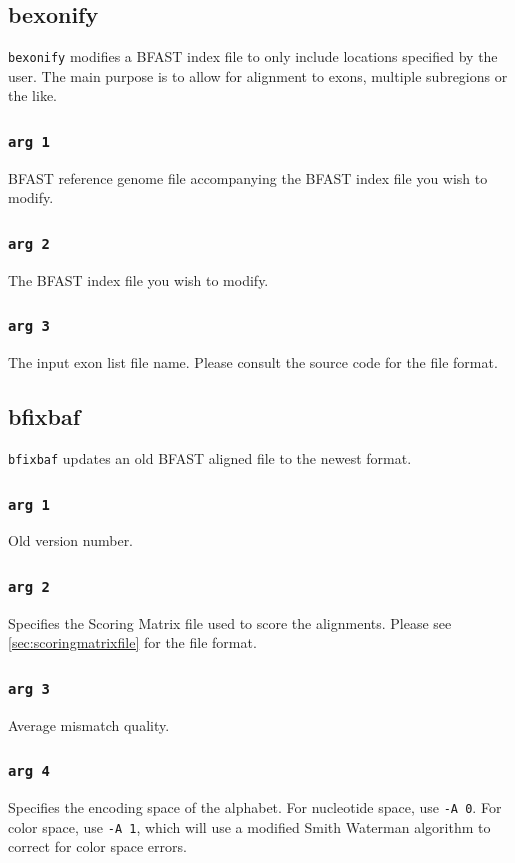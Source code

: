 \documentclass[a4paper,12pt]{book}
\newcommand{\TT}[1]{{\tt #1}} %
\newcommand{\BRGF}{BFAST reference genome file} %
\newcommand{\BIF}{BFAST index file} %
\newcommand{\BAF}{BFAST aligned file} %
\begin{document}
\subsection{bexonify}
\label{sec:bexonify}
\TT{bexonify} modifies a \BIF{} to only include locations specified by the user.  
The main purpose is to allow for alignment to exons, multiple subregions or the like.

\subsubsection{\TT{arg 1}}
\BRGF{} accompanying the \BIF{} you wish to modify.

\subsubsection{\TT{arg 2}}
The \BIF{} you wish to modify.

\subsubsection{\TT{arg 3}}
The input exon list file name. 
Please consult the source code for the file format.
\subsection{bfixbaf}
\label{sec:bfixbaf}
\TT{bfixbaf} updates an old \BAF{} to the newest format.
\subsubsection{\TT{arg 1}}
Old version number.
\subsubsection{\TT{arg 2}}
Specifies the Scoring Matrix file used to score the alignments.
Please see \autoref{sec:scoringmatrixfile} for the file format.
\subsubsection{\TT{arg 3}}
Average mismatch quality.
\subsubsection{\TT{arg 4}}
Specifies the encoding space of the alphabet.
For nucleotide space, use \TT{-A 0}.
For color space, use \TT{-A 1}, which will use a modified Smith Waterman algorithm to correct for color space errors.
\end{document}
